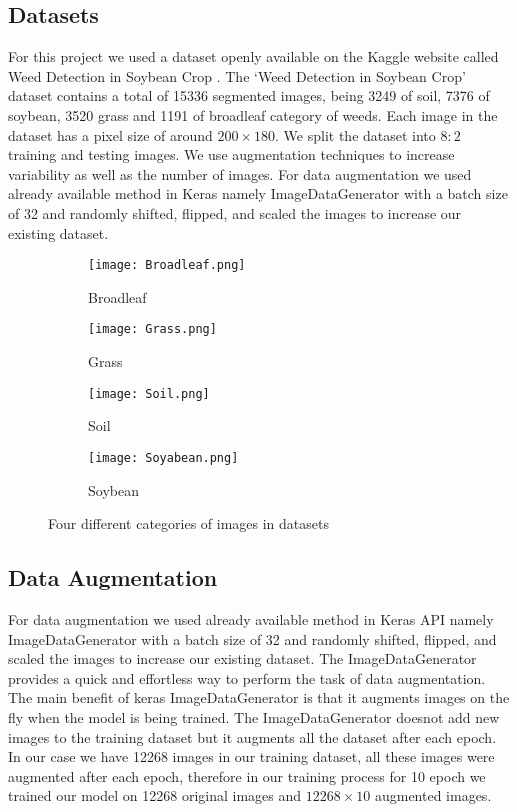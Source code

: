 \documentclass{report}
\begin{document}
\subsection{Datasets}
For this project we used a dataset openly available on the Kaggle website called Weed Detection in Soybean Crop \cite{kaggle}. The ‘Weed Detection in Soybean Crop’ dataset contains a total of 15336 segmented images, being 3249 of soil, 7376 of soybean, 3520 grass and 1191 of broadleaf category of weeds. Each image in the dataset has a pixel size of around $200\times180$. We split the dataset into $8:2$ training and testing images. We use augmentation techniques to increase variability as well as the number of images. For data augmentation we used already available method in Keras namely ImageDataGenerator with a batch size of 32 and randomly shifted, flipped, and scaled the images to increase our existing dataset. 

\begin{figure}[H]
\centering
    \begin{subfigure}[b]{0.3\textwidth}
         \texttt{[image: Broadleaf.png]}
         \caption{Broadleaf}
         \label{fig:1}
     \end{subfigure}
    
     \begin{subfigure}[b]{0.3\textwidth}
\texttt{[image: Grass.png]}
         \caption{Grass}
         \label{fig:2}
     \end{subfigure}
     \begin{subfigure}[b]{0.3\textwidth}
         \texttt{[image: Soil.png]}
         \caption{Soil}
         \label{fig:3}
     \end{subfigure}
     \begin{subfigure}[b]{0.3\textwidth}
         \texttt{[image: Soyabean.png]}
         \caption{Soybean}
         \label{fig:4}
     \end{subfigure}
     \caption{Four different categories of images in datasets}
    \label{fig:lebeled_img}
\end{figure}

\subsection{Data Augmentation}
For data augmentation we used already available method in Keras API namely ImageDataGenerator with a batch size of 32 and randomly shifted, flipped, and scaled the images to increase our existing dataset. The ImageDataGenerator provides a quick and effortless way to perform the task of data augmentation. The main benefit of keras ImageDataGenerator is that it augments images on the fly when the model is being trained. The ImageDataGenerator doesnot add new images to the training dataset but it augments all the dataset after each epoch. In our case we have 12268 images in our training dataset, all these images were augmented after each epoch, therefore in our training process for 10 epoch we trained our model on 12268 original images and $12268\times10$ augmented images. 
\end{document}
